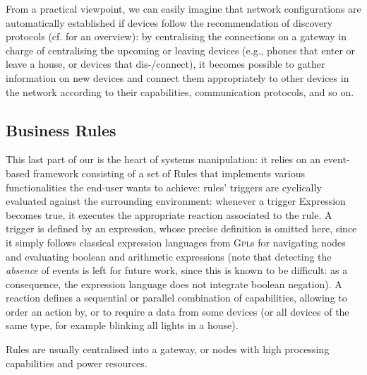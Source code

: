 From a practical viewpoint, we can easily imagine that network configurations are automatically established if devices follow the recommendation of discovery protocols (cf. \cite{} for an overview): by centralising the connections on a gateway in charge of centralising the upcoming or leaving devices (e.g., phones that enter or leave a house, or devices that dis-/connect), it becomes possible to gather information on new devices and connect them appropriately to other devices in the network according to their capabilities, communication protocols, and so on.
	
\subsection{Business Rules}
\label{sec:IoTDSL-BusinessRules}

This last part of our \DSL is the heart of \IOT systems manipulation: it relies on an event-based framework consisting of a set of \textsf{Rule}s that implements various functionalities the end-user wants to achieve: rules' \textsf{trigger}s are cyclically evaluated against the surrounding environment: whenever a \textsf{trigger} \textsf{Expression} becomes true, it executes the appropriate \textsf{reaction} associated to the rule. A \textsf{trigger} is defined by an expression, whose precise definition is omitted here, since it simply follows classical expression languages from \textsc{Gpl}s for navigating nodes and evaluating boolean and arithmetic expressions (note that detecting the \emph{absence} of events is left for future work, since this is known to be difficult: as a consequence, the expression language does not integrate boolean negation). A \textsf{reaction} defines a sequential or parallel combination of capabilities, allowing to order an action by, or to require a data from some devices (or all devices of the same type, for example blinking all lights in a house).
	
Rules are usually centralised into a gateway, or nodes with high processing capabilities and power resources. 

